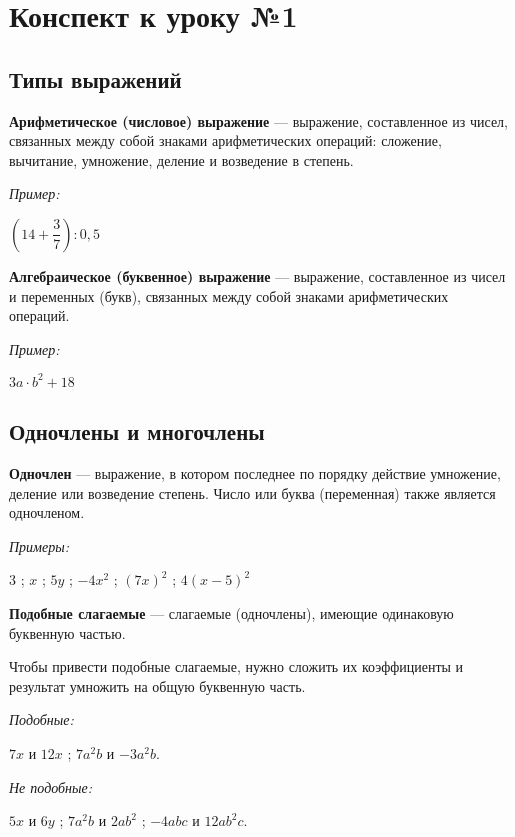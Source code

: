 \documentclass[12pt, a4paper]{article}
\begin{document}
		
	
	\section*{Конспект к уроку №1}
	\subsection*{Типы выражений}
	\textbf{Арифметическое (числовое) выражение} — выражение, составленное из чисел, связанных между собой знаками арифметических операций: сложение, вычитание, умножение, деление и возведение в степень.
	
	\textit{Пример:}
	\begin{center}
		$(14+\dfrac37):0,5$
	\end{center}

	\textbf{Алгебраическое (буквенное) выражение } — выражение, составленное из чисел и переменных (букв), связанных между собой знаками арифметических операций.
	
	\textit{Пример:}
	\begin{center}
		$3a\cdot b^2 + 18$
	\end{center}
	
	\subsection*{Одночлены и многочлены}
	
	\textbf{Одночлен} — выражение, в котором последнее по порядку действие умножение, деление или возведение степень. Число или буква (переменная) также является одночленом.
	
	\textit{Примеры:}
	\begin{center}
		$3$ ; $x$ ; $5y$ ; $-4x^2$ ; $(7x)^2$ ; $4(x-5)^2$
	\end{center}

	\textbf{Подобные слагаемые} — слагаемые (одночлены), имеющие одинаковую буквенную частью.

	Чтобы привести подобные слагаемые, нужно сложить их коэффициенты и результат умножить на общую буквенную часть.
	
	\textit{Подобные:}
	\begin{center}
		 $7x$ и $12x$ ; $7a^2b$ и $-3a^2b$.
	\end{center}
	
	\textit{Не подобные:}
	\begin{center}
		$5x$ и $6y$ ; $7a^2b$ и $2ab^2$ ; $-4abc$ и $12ab^2c$.
	\end{center}
\end{document}
